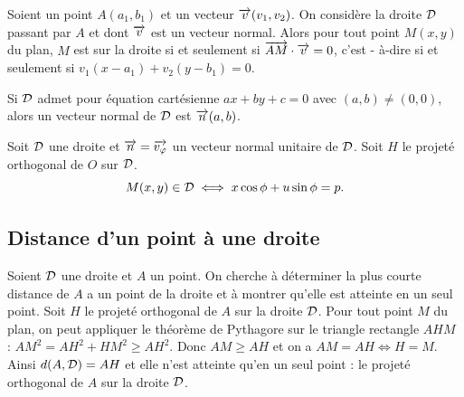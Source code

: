 \begin{prop}
  Soient un point \(A(a_1 , b_1)\) et un vecteur \(\overrightarrow{v}(v_1 , v_2)\). On 
  considère la droite \(\mathcal{D}\) passant par \(A\) et dont \(\overrightarrow{v}\) est un vecteur 
  normal.  Alors pour tout point \(M(x , y)\) du plan, \(M\) est sur la droite 
  si et seulement si \(\overrightarrow{AM}\cdot\overrightarrow{v} = 0\), c'est - à-dire si et seulement 
  si \(v_1(x - a_1) + v_2(y - b_1) = 0\).
\end{prop}

Si \(\mathcal{D}\) admet pour équation cartésienne \(ax + by + c = 0\) avec \((a , b) 
\neq (0 , 0)\), alors un vecteur normal de \(\mathcal{D}\) est \(\overrightarrow{n}(a , b)\).

\begin{prop}
  Soit \(\mathcal{D}\) une droite et \(\overrightarrow{n} = \overrightarrow{v_\varphi}\) un vecteur normal 
  unitaire de \(\mathcal{D}\). Soit \(H\) le projeté orthogonal de \(O\) sur \(\mathcal{D}\).
  \begin{equation}
    M(x , y) \in \mathcal{D} \iff x\cos\phi + u \sin\phi = p.
  \end{equation}
\end{prop}

\subsection{Distance d'un point à une droite}

Soient \(\mathcal{D}\) une droite et \(A\) un point. On cherche à déterminer la plus 
courte distance de \(A\) a un point de la droite et à montrer qu'elle est 
atteinte en un seul point. Soit \(H\) le projeté orthogonal de \(A\) sur la 
droite \(\mathcal{D}\). Pour tout point \(M\) du plan, on peut appliquer le théorème 
de Pythagore sur le triangle rectangle \(AHM\) : \(AM^2 = AH^2 + HM^2 
\geqslant AH^2\). Donc \(AM \geqslant AH\) et on a \(AM = AH \iff H = M\). 
Ainsi \(d(A , \mathcal{D}) = AH\) et elle n'est atteinte qu'en un seul point : le 
projeté orthogonal de \(A\) sur la droite \(\mathcal{D}\).

